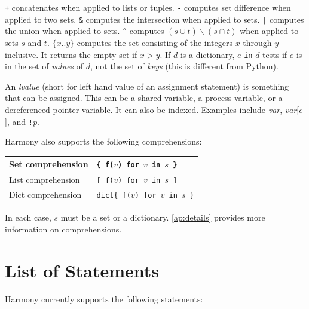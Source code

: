 \documentclass{report}
\begin{document}
\texttt{+} concatenates when applied to lists or tuples.
\texttt{-} computes set difference when applied to two sets.
\texttt{\&} computes the intersection when applied to sets.
\texttt{|} computes the union when applied to sets.
\texttt{\^} computes $(s \cup t) \backslash (s \cap t)$ when applied to sets $s$ and $t$.
\texttt{$\{ x .. y \}$} computes the set consisting of the integers $x$
through $y$ inclusive.  It returns the empty set if $x > y$.
If $d$ is a dictionary, $e$ \texttt{in} $d$ tests if $e$ is in the set of
\emph{values} of $d$, not the set of \emph{keys} (this is different from Python).

An \emph{lvalue}
%
(short for left hand value of an assignment statement)
is something that can be assigned.  This can be a
shared variable, a process variable, or a dereferenced pointer
variable.  It can also be indexed.  Examples include
\textit{var}, \textit{var}[$e$], and \texttt{!}\textit{p}.

Harmony also supports the following comprehensions:

\vspace{1em}
\begin{tabular}{|l|l|}
\hline
Set comprehension & \texttt{\{ f($v$) for $v$ in $s$ \}} \\
\hline
List comprehension & \texttt{[ f($v$) for $v$ in $s$ ]} \\
\hline
Dict comprehension & \texttt{dict\{ f($v$) for $v$ in $s$ \}} \\
\hline
\end{tabular}
\vspace{1em}

In each case, $s$ must be a set or a dictionary.
\autoref{ap:details} provides more information on comprehensions.

\chapter{List of Statements}

Harmony currently supports the following statements:
\end{document}
